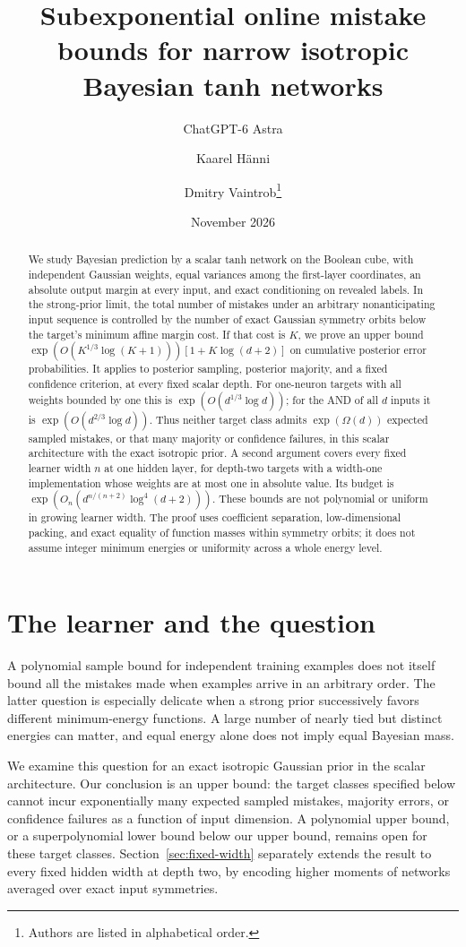 \documentclass[11pt]{article}
\title{Subexponential online mistake bounds for narrow isotropic Bayesian tanh networks}
\author{ChatGPT-6 Astra \and Kaarel H\"anni \and Dmitry Vaintrob\thanks{Authors are listed in alphabetical order.}}
\date{November 2026}
\begin{document}
\maketitle
\begin{abstract}
We study Bayesian prediction by a scalar tanh network on the Boolean cube, with independent Gaussian weights, equal variances among the first-layer coordinates, an absolute output margin at every input, and exact conditioning on revealed labels. In the strong-prior limit, the total number of mistakes under an arbitrary nonanticipating input sequence is controlled by the number of exact Gaussian symmetry orbits below the target's minimum affine margin cost. If that cost is $K$, we prove an upper bound $\exp(O(K^{1/3}\log(K+1)))[1+K\log(d+2)]$ on cumulative posterior error probabilities. It applies to posterior sampling, posterior majority, and a fixed confidence criterion, at every fixed scalar depth. For one-neuron targets with all weights bounded by one this is $\exp(O(d^{1/3}\log d))$; for the AND of all $d$ inputs it is $\exp(O(d^{2/3}\log d))$. Thus neither target class admits $\exp(\Omega(d))$ expected sampled mistakes, or that many majority or confidence failures, in this scalar architecture with the exact isotropic prior. A second argument covers every fixed learner width $n$ at one hidden layer, for depth-two targets with a width-one implementation whose weights are at most one in absolute value. Its budget is $\exp(O_n(d^{n/(n+2)}\log^4(d+2)))$. These bounds are not polynomial or uniform in growing learner width. The proof uses coefficient separation, low-dimensional packing, and exact equality of function masses within symmetry orbits; it does not assume integer minimum energies or uniformity across a whole energy level.
\end{abstract}

\section{The learner and the question}
A polynomial sample bound for independent training examples does not itself bound all the mistakes made when examples arrive in an arbitrary order. The latter question is especially delicate when a strong prior successively favors different minimum-energy functions. A large number of nearly tied but distinct energies can matter, and equal energy alone does not imply equal Bayesian mass.

We examine this question for an exact isotropic Gaussian prior in the scalar architecture. Our conclusion is an upper bound: the target classes specified below cannot incur exponentially many expected sampled mistakes, majority errors, or confidence failures as a function of input dimension. A polynomial upper bound, or a superpolynomial lower bound below our upper bound, remains open for these target classes. Section~\ref{sec:fixed-width} separately extends the result to every fixed hidden width at depth two, by encoding higher moments of networks averaged over exact input symmetries.
\end{document}
